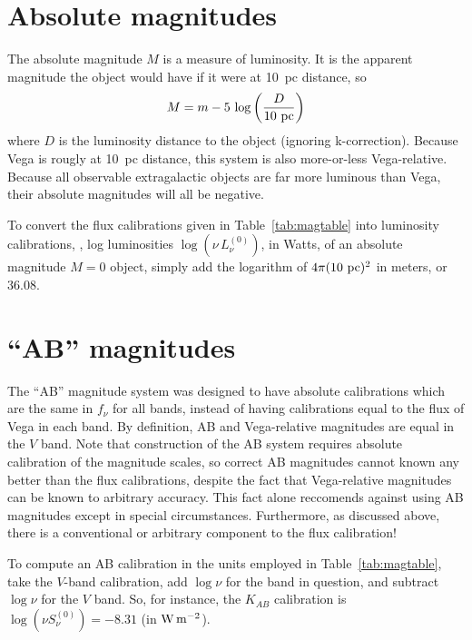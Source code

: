 \section{Absolute magnitudes}

The absolute magnitude $M$ is a measure of luminosity.  It is the apparent
magnitude the object would have if it were at 10~pc distance, so
\begin{equation}
M = m - 5\,\log\left(\frac{D}{\rm 10~pc}\right)
\end{equation}
where $D$ is the luminosity distance to the object (ignoring
k-correction).  Because Vega is rougly at 10~pc distance, this system
is also more-or-less Vega-relative.  Because all observable
extragalactic objects are far more luminous than Vega, their absolute
magnitudes will all be negative.

To convert the flux calibrations given in Table~\ref{tab:magtable}
into luminosity calibrations, \ie, log luminosities
$\log(\nu\,L_{\nu}^{(0)})$, in Watts, of an absolute magnitude $M=0$
object, simply add the logarithm of $4\pi(10~{\rm pc})^2$ in meters,
or $36.08$.


\section{``AB'' magnitudes}

The ``AB'' magnitude system was designed to have absolute calibrations
which are the same in $f_{\nu}$ for all bands, instead of having
calibrations equal to the flux of Vega in each band.  By definition,
AB and Vega-relative magnitudes are equal in the $V$ band.  Note that
construction of the AB system requires absolute calibration of the
magnitude scales, so correct AB magnitudes cannot known any better
than the flux calibrations, despite the fact that Vega-relative
magnitudes can be known to arbitrary accuracy.  This fact alone
reccomends against using AB magnitudes except in special
circumstances.  Furthermore, as discussed above, there is a
conventional or arbitrary component to the flux calibration!

To compute an AB calibration in the units employed in
Table~\ref{tab:magtable}, take the $V$-band calibration, add $\log\nu$
for the band in question, and subtract $\log\nu$ for the $V$ band.
So, for instance, the $K_{AB}$ calibration is $\log(\nu
S_{\nu}^{(0)})=-8.31$ (in ${\rm W\,m^{-2}}$).


